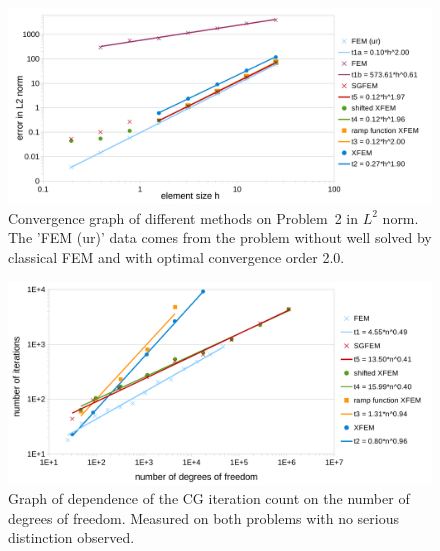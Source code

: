 \documentclass{elsarticle}
\newcommand{\prob}[1]{Problem~{#1}}
\begin{document}
\begin{figure}[!htb]
  \centering    
  \includegraphics[width=\textwidth]{results/convergence_sin.pdf}
  \caption[Convergence graph \prob{2}]{Convergence graph of different methods on 
  \prob{2} in $L^2$ norm. The 'FEM (ur)'
  data comes from the problem without well solved by classical FEM and with optimal convergence order 2.0.}
  \label{fig:convergence_sin}
\end{figure}


\begin{figure}[!htb]
  \centering    
  \includegraphics[width=\textwidth]{results/iterations.pdf}
  \caption[Iterations graph]{Graph of dependence of the CG iteration count on the 
  number of degrees of freedom. Measured on both problems with no serious distinction observed.}
  \label{fig:iterations}
\end{figure}
\end{document}
